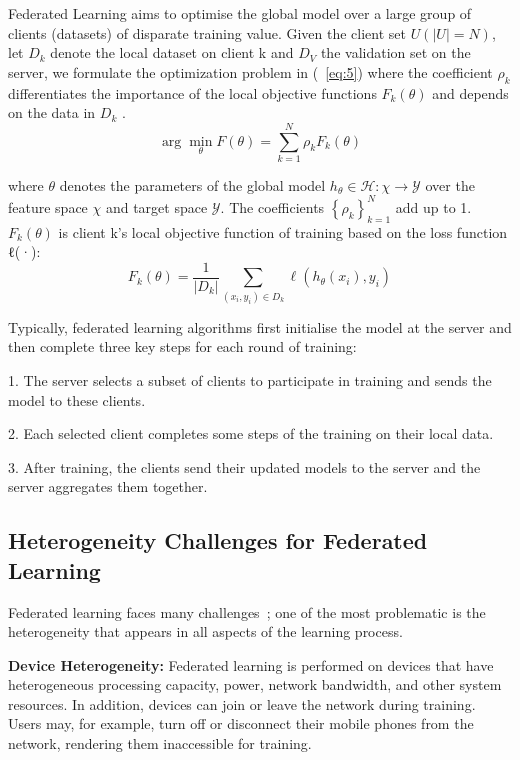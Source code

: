 \documentclass[withindex,glossary,firstyr]{cam-thesis}
\begin{document}
Federated Learning aims to optimise the global model over a large group of clients (datasets) of disparate training value. Given the client set $U(|U| = N)$, let $D_k$ denote the local dataset on client k and $D_V$ the validation set on the server, we formulate the optimization problem in (~\ref{eq:5}) where the coefficient $ρ_k$ differentiates the importance of the local objective functions $F_k(\theta)$ and depends on the data in $D_k$ . 
\begin{equation}
\arg \min _{\theta} F(\theta)=\sum_{k=1}^{N} \rho_{k} F_{k}(\theta)
\label{eq:5}
\end{equation}

where $\theta$ denotes the parameters of the global model \(h_{\theta} \in \mathcal{H}: \chi \rightarrow \mathcal{Y}\) over the feature space \(\chi\) and target space \(\mathcal{Y}\). The coefficients \(\left\{\rho_{k}\right\}_{k=1}^{N}\) add up to 1. \(F_{k}(\theta)\) is client k’s local objective function of training based on the loss function ℓ(·):
\begin{equation}
F_{k}(\theta)=\frac{1}{\left|D_{k}\right|} \sum_{\left(x_{i}, y_{i}\right) \in D_{k}} \ell\left(h_{\theta}\left(x_{i}\right), y_{i}\right)
\end{equation}

Typically, federated learning algorithms first initialise the model at the server and then complete three key steps for each round of training:

1. The server selects a subset of clients to participate in training and sends the model to these clients.

2. Each selected client completes some steps of the training on their local data.

3. After training, the clients send their updated models to the server and the server aggregates them together.



\subsection{Heterogeneity Challenges for Federated Learning}
\label{sec:hetero_challenges}

Federated learning faces many challenges~\cite{li2020federated}; one of the most problematic is the heterogeneity that appears in all aspects of the learning process.

\textbf{Device Heterogeneity:} Federated learning is performed on devices that have heterogeneous processing capacity, power, network bandwidth, and other system resources. In addition, devices can join or leave the network during training. Users may, for example, turn off or disconnect their mobile phones from the network, rendering them inaccessible for training. 
\end{document}
